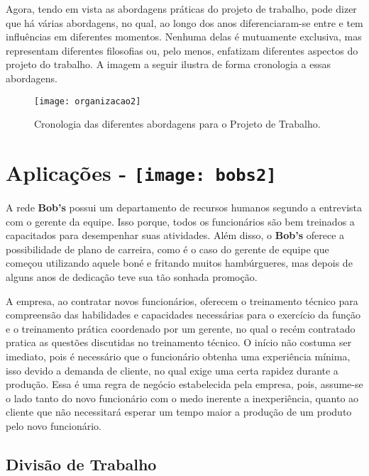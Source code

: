 		Agora, tendo em vista as abordagens práticas do projeto de trabalho, pode dizer que há várias abordagens, no qual, ao longo dos anos diferenciaram-se entre e tem influências em diferentes momentos. Nenhuma delas é mutuamente exclusiva, mas representam diferentes filosofias ou, pelo menos, enfatizam diferentes aspectos do projeto do trabalho. A imagem a seguir ilustra de forma cronologia a essas abordagens.

		\begin{figure}[h]
			\centering
			\texttt{[image: organizacao2]}
			\caption[Cronologia das diferentes abordagens para o Projeto de Trabalho]{Cronologia das diferentes abordagens para o Projeto de Trabalho. \cite{slack}}
			\label{fig:organizacao2}
		\end{figure}

	\section[Aplicações]{Aplicações - \texttt{[image: bobs2]}}
	\label{sec:organizacao_aplicacoes}

		A rede \textbf{Bob’s} possui um departamento de recursos humanos segundo a entrevista com o gerente da equipe. Isso porque, todos os funcionários são bem treinados a capacitados para desempenhar suas atividades. Além disso, o \textbf{Bob’s} oferece a possibilidade de plano de carreira, como é o caso do gerente de equipe que começou utilizando aquele boné e fritando muitos hambúrgueres, mas depois de alguns anos de dedicação teve sua tão sonhada promoção. 
		
		A empresa, ao contratar novos funcionários, oferecem o treinamento técnico para compreensão das habilidades e capacidades necessárias para o exercício da função e o treinamento prática coordenado por um gerente, no qual o recém contratado pratica as questões discutidas no treinamento técnico. O início não costuma ser imediato, pois é necessário que o funcionário obtenha uma experiência mínima, isso devido a demanda de cliente, no qual exige uma certa rapidez durante a produção. Essa é uma regra de negócio estabelecida pela empresa, pois, assume-se o lado tanto do novo funcionário com o medo inerente a inexperiência, quanto ao cliente que não necessitará esperar um tempo maior a produção de um produto pelo novo funcionário.

		\subsection[Divisão de Trabalho]{Divisão de Trabalho}
		\label{sec:organizacao_dt}

